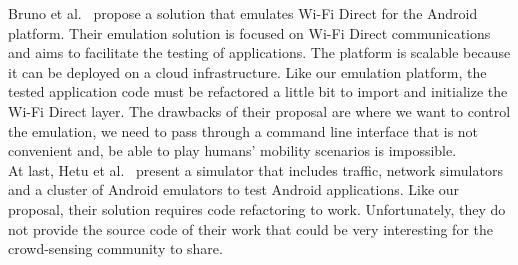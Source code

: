 Bruno et al.~\cite{DBLP:journals/amsys/Bruno0F15} propose a solution that emulates Wi-Fi Direct for the Android platform.
Their emulation solution is focused on Wi-Fi Direct communications and aims to facilitate the testing of applications.
The platform is scalable because it can be deployed on a cloud infrastructure.
Like our emulation platform, the tested application code must be refactored a little bit to import and initialize the Wi-Fi Direct layer.
The drawbacks of their proposal are where we want to control the emulation, we need to pass through a command line interface that is not convenient and, be able to play humans' mobility scenarios is impossible.
\\

At last, Hetu et al.~\cite{DBLP:conf/vtc/HetuHP14} present a simulator that includes traffic, network simulators and a cluster of Android emulators to test Android applications.
Like our proposal, their solution requires code refactoring to work.
Unfortunately, they do not provide the source code of their work that could be very interesting for the crowd-sensing community to share.

